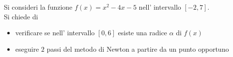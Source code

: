 Si consideri la funzione $f(x)=x^2-4x-5$ nell' intervallo
$[-2,7]$.\\[1ex]
\noindent
Si chiede di
\begin{itemize}
\item verificare se nell' intervallo $[0,6]$ esiste una radice $\alpha$ di $f(x)$
\item eseguire $2$ passi del metodo di Newton a partire da un punto opportuno
\end{itemize}
